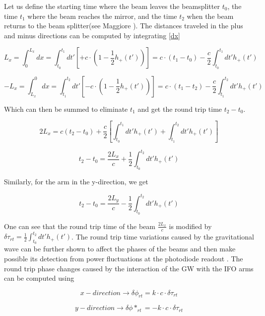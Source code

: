 Let us define the starting time where the beam leaves the beamsplitter $t_0$, the time $t_1$ where the beam reaches the mirror, and the time $t_2$ when the beam returns to the beam splitter(see Maggiore \cite[chapter 9]{Maggiore:2007ulw}). The distances traveled in the plus and minus directions can be computed by integrating \ref{dx}

\begin{equation}
L_{x}  = \int_0^{L_x} dx = \int_{t_0}^{t_1} dt' \left[+c \cdot\left(1-\frac{1}{2} h_+(t') \right)\right] = c\cdot(t_1-t_0) - \frac{c}{2} \int_{t_0}^{t_1} dt' h_+(t') 
\end{equation}

\begin{equation}
-L_{x}  = \int^0_{L_x} dx = \int_{t_1}^{t_2} dt' \left[-c \cdot\left(1-\frac{1}{2} h_+(t') \right)\right] = c\cdot(t_1-t_2) - \frac{c}{2} \int_{t_1}^{t_2} dt' h_+(t')
\end{equation}


Which can then be summed to eliminate $t_1$ and get the round trip time $t_2-t_0$.

\begin{equation}
2L_x = c(t_2 - t_0) + \frac{c}{2} \left[ \int_{t_0}^{t_1} dt' h_+(t') +  \int_{t_1}^{t_2} dt' h_+(t')\right]
\end{equation}

\begin{equation}
t_2 - t_0 = \frac{2L_x}{c} + \frac{1}{2} \int_{t_0}^{t_2} dt' h_+(t')
\end{equation}

Similarly, for the arm in the y-direction, we get

\begin{equation}
t_2 - t_0 = \frac{2L_y}{c} - \frac{1}{2} \int_{t_0}^{t_2} dt' h_+(t')
\end{equation}

One can see that the round trip time of the beam $\frac{2L_x}{c}$ is modified by $\delta \tau_{rt} = \frac{1}{2} \int_{t_0}^{t_2} dt' h_+(t')$. The round trip time variations caused by the gravitational wave can be further shown to affect the phases of the beams and then make possible its detection from power fluctuations at the photodiode readout \cite{Saulson:1995zi}. The round trip phase changes caused by the interaction of the GW with the IFO arms can be computed using 

\begin{equation}
x-direction \rightarrow \delta \phi_{rt} = k\cdot c \cdot \delta \tau_{rt}
\end{equation}

\begin{equation}
y-direction \rightarrow \delta \phi*_{rt} = - k\cdot c \cdot \delta \tau_{rt}
\end{equation}

